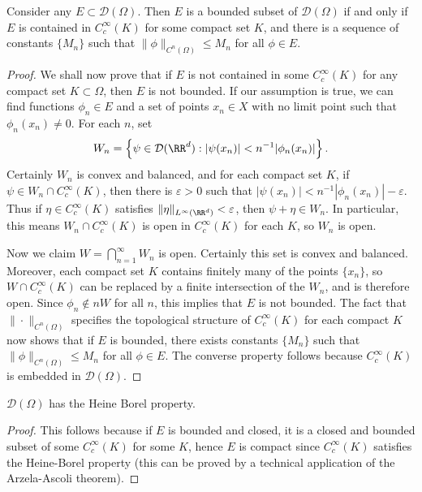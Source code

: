 \begin{theorem}
    Consider any $E \subset \mathcal{D}(\Omega)$. Then $E$ is a bounded subset of $\mathcal{D}(\Omega)$ if and only if $E$ is contained in $C_c^\infty(K)$ for some compact set $K$, and there is a sequence of constants $\{ M_n \}$ such that $\| \phi \|_{C^n(\Omega)} \leq M_n$ for all $\phi \in E$.
\end{theorem}
\begin{proof}
    We shall now prove that if $E$ is not contained in some $C_c^\infty(K)$ for any compact set $K \subset \Omega$, then $E$ is not bounded. If our assumption is true, we can find functions $\phi_n \in E$ and a set of points $x_n \in X$ with no limit point such that $\phi_n(x_n) \neq 0$. For each $n$, set
    \[ W_n = \left\{ \psi \in \mathcal{D}(\RR^d): |\psi(x_n)| < n^{-1} |\phi_n(x_n)| \right\}. \]
    Certainly $W_n$ is convex and balanced, and for each compact set $K$, if $\psi \in W_n \cap C_c^\infty(K)$, then there is $\varepsilon > 0$ such that $|\psi(x_n)| < n^{-1} |\phi_n(x_n)| - \varepsilon$. Thus if $\eta \in C_c^\infty(K)$ satisfies $\| \eta \|_{L^\infty(\RR^d)} < \varepsilon$, then $\psi + \eta \in W_n$. In particular, this means $W_n \cap C_c^\infty(K)$ is open in $C_c^\infty(K)$ for each $K$, so $W_n$ is open.

    Now we claim $W = \bigcap_{n = 1}^\infty W_n$ is open. Certainly this set is convex and balanced. Moreover, each compact set $K$ contains finitely many of the points $\{ x_n \}$, so $W \cap C_c^\infty(K)$ can be replaced by a finite intersection of the $W_n$, and is therefore open. Since $\phi_n \not \in nW$ for all $n$, this implies that $E$ is not bounded. The fact that $\| \cdot \|_{C^n(\Omega)}$ specifies the topological structure of $C_c^\infty(K)$ for each compact $K$ now shows that if $E$ is bounded, there exists constants $\{ M_n \}$ such that $\| \phi \|_{C^n(\Omega)} \leq M_n$ for all $\phi \in E$. The converse property follows because $C_c^\infty(K)$ is embedded in $\mathcal{D}(\Omega)$.
\end{proof}

\begin{corollary}
    $\mathcal{D}(\Omega)$ has the Heine Borel property.
\end{corollary}
\begin{proof}
    This follows because if $E$ is bounded and closed, it is a closed and bounded subset of some $C_c^\infty(K)$ for some $K$, hence $E$ is compact since $C_c^\infty(K)$ satisfies the Heine-Borel property (this can be proved by a technical application of the Arzela-Ascoli theorem).
\end{proof}

